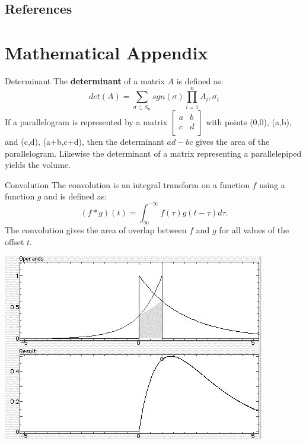 \documentclass[xcolor=dvipsnames]{beamer}
\begin{document}
\subsection{References}

\section{Mathematical Appendix}

\begin{frame}[label=math-determinant]{Determinant}
The \textbf{determinant} of a matrix $A$ is defined as:
 \begin{equation}
  det(A) = \sum_{\sigma \subset S_n} sgn(\sigma)
           \prod_{i=1}^{n} A_i,\sigma_i
 \end{equation}
If a parallelogram is represented by a matrix 
$
 \begin{bmatrix}
   a &
   b \\
   c &
   d \\
 \end{bmatrix}
$
with points (0,0), (a,b), and (c,d), (a+b,c+d), then the determinant $ad-bc$ gives the area of the parallelogram. Likewise the determinant of a matrix representing a parallelepiped yields the volume. 
\end{frame}

\begin{frame}[label=math-convolution]{Convolution}
 The convolution is an integral transform on a function $f$ using a function $g$ and is defined as:
 \begin{equation}
  (f*g)(t) = \int_{\infty}^{-\infty} f(\tau) g(t-\tau) d\tau.
 \end{equation}
 The convolution gives the area of overlap between $f$ and $g$ for all values of the offset $t$.
\end{frame}

\begin{frame}
\includegraphics[width=\textwidth]{imgs/convolution.jpg}
\end{frame}
\end{document}
